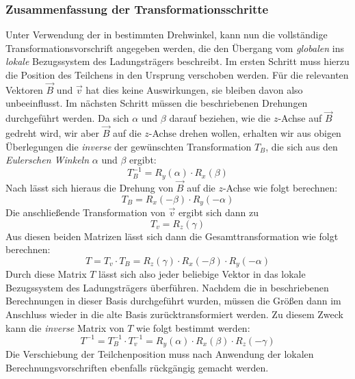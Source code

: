 \subsubsection{Zusammenfassung der Transformationsschritte}
Unter Verwendung der in  bestimmten Drehwinkel, kann nun die vollst\"andige Transformationsvorschrift angegeben
werden, die den \"Ubergang vom \textit{globalen} ins \textit{lokale} Bezugssystem des Ladungstr\"agers beschreibt. Im ersten Schritt
muss hierzu die Position des Teilchens in den Ursprung verschoben werden. F\"ur die relevanten Vektoren \(\vec{B}\) und \(\vec{v}\)
hat dies keine Auswirkungen, sie bleiben davon also unbeeinflusst. Im n\"achsten Schritt m\"ussen die beschriebenen Drehungen
durchgef\"uhrt werden. Da sich \(\alpha\) und \(\beta\) darauf beziehen, wie die \(z\)-Achse auf \(\vec{B}\) gedreht wird, wir aber
\(\vec{B}\) auf die \(z\)-Achse drehen wollen, erhalten wir aus obigen \"Uberlegungen die \textit{inverse} der gew\"unschten
Transformation \(T_B\), die sich aus den \textit{Eulerschen Winkeln} \(\alpha\) und \(\beta\) ergibt:
\begin{equation}
  T_B^{-1} = R_y(\alpha) \cdot R_x(\beta)
\end{equation}
Nach  l\"asst sich hieraus die Drehung von \(\vec{B}\) auf die \(z\)-Achse wie folgt berechnen:
\begin{equation}
  T_B = R_x(-\beta) \cdot R_y(-\alpha)
\end{equation}
Die anschlie{\ss}ende Transformation von \(\vec{v}\) ergibt sich dann zu
\begin{equation}
  T_v = R_z(\gamma)
\end{equation}
Aus diesen beiden Matrizen l\"asst sich dann die Gesamttransformation wie folgt berechnen:
\begin{equation}
  T = T_v \cdot T_B = R_z(\gamma) \cdot R_x(-\beta) \cdot R_y(-\alpha)
\end{equation}
Durch diese Matrix \(T\) l\"asst sich also jeder beliebige Vektor in das lokale Bezugssystem des Ladungstr\"agers \"uberf\"uhren.
Nachdem die in  beschriebenen Berechnungen in dieser Basis durchgef\"uhrt wurden,
m\"ussen die Gr\"o{\ss}en dann im
Anschluss wieder in die alte Basis zur\"ucktransformiert werden. Zu diesem Zweck kann die \textit{inverse} Matrix von \(T\)
wie folgt bestimmt werden:
\begin{equation}
  T^{-1} = T_B^{-1} \cdot T_v^{-1} = R_y(\alpha) \cdot R_x(\beta) \cdot R_z(-\gamma)
\end{equation}
Die Verschiebung der Teilchenposition muss nach Anwendung der lokalen Berechnungsvorschriften ebenfalls r\"uckg\"angig gemacht werden.

